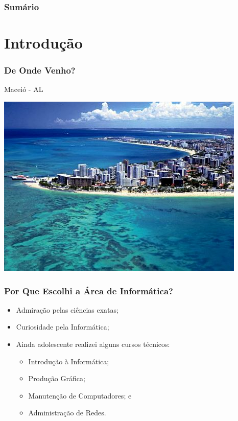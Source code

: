 \documentclass{beamer}
\begin{document}
\begin{frame}
	\frametitle{Sumário}
  	\tableofcontents
\end{frame}


\section{Introdução}

\begin{frame}
	\frametitle{De Onde Venho?}

	\begin{block}{Maceió - AL}
		\begin{center}
			\includegraphics[scale=0.4]{imagens/maceio}
		\end{center}
	\end{block}
\end{frame}

\begin{frame}
	\frametitle{Por Que Escolhi a Área de Informática?}

	\begin{itemize}
		\item Admiração pelas ciências exatas;
		\item Curiosidade pela Informática;
		\item Ainda adolescente realizei alguns cursos técnicos:
		\begin{itemize}
			\item Introdução à Informática;
			\item Produção Gráfica;
			\item Manutenção de Computadores; e
			\item Administração de Redes.
		\end{itemize}
	\end{itemize}
\end{frame}
\end{document}
